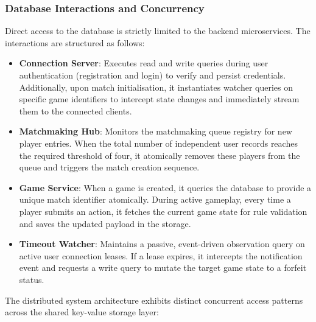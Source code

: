 \documentclass{scrartcl}
\begin{document}
\subsubsection*{Database Interactions and Concurrency}
Direct access to the database is strictly limited to the backend microservices. The interactions are structured as follows:
\begin{itemize}
    \item \textbf{Connection Server}: Executes read and write queries during user authentication (registration and login) to verify and persist credentials. Additionally, upon match initialisation, it instantiates watcher queries on specific game identifiers to intercept state changes and immediately stream them to the connected clients.
    \item \textbf{Matchmaking Hub}: Monitors the matchmaking queue registry for new player entries. When the total number of independent user records reaches the required threshold of four, it atomically removes these players from the queue and triggers the match creation sequence.
    \item \textbf{Game Service}: When a game is created, it queries the database to provide a unique match identifier atomically. During active gameplay, every time a player submits an action, it fetches the current game state for rule validation and saves the updated payload in the storage.
    \item \textbf{Timeout Watcher}: Maintains a passive, event-driven observation query on active user connection leases. If a lease expires, it intercepts the notification event and requests a write query to mutate the target game state to a forfeit status.
\end{itemize}
The distributed system architecture exhibits distinct concurrent access patterns across the shared key-value storage layer:
\end{document}
